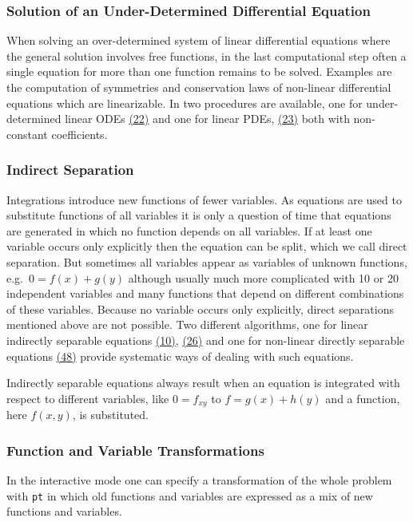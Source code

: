 \subsubsection{Solution of an Under-Determined Differential Equation}

When solving an over-determined system of linear differential
equations where the general solution involves free functions, in the
last computational step often a single equation for more than one
function remains to be solved.  Examples are the computation of
symmetries and conservation laws of non-linear differential equations
which are linearizable.  In  two procedures are
available, one for under-determined linear ODEs
\hyperlink{crack-m_22}{(22)} and one for linear PDEs,
\hyperlink{crack-m_23}{(23)} both with non-constant coefficients.

\subsubsection{Indirect Separation}

Integrations introduce new functions of fewer variables.  As equations
are used to substitute functions of all variables it is only a
question of time that equations are generated in which no function
depends on all variables.  If at least one variable occurs only
explicitly then the equation can be split, which we call direct
separation.  But sometimes all variables appear as variables of
unknown functions, e.g.\ $0=f(x)+g(y)$ although usually much more
complicated with 10 or 20 independent variables and many functions
that depend on different combinations of these variables.  Because no
variable occurs only explicitly, direct separations mentioned above
are not possible.  Two different algorithms, one for linear indirectly
separable equations \hyperlink{crack-m_10}{(10)},
\hyperlink{crack-m_26}{(26)} and one for non-linear directly separable
equations \hyperlink{crack-m_48}{(48)} provide systematic ways of
dealing with such equations.

Indirectly separable equations always result when an equation is
integrated with respect to different variables, like $0=f_{xy}$ to
$f=g(x)+h(y)$ and a function, here $f(x,y)$, is substituted.

\subsubsection{Function and Variable Transformations}

In the interactive mode one can specify a transformation of the whole
problem with \texttt{pt} in which old functions and variables are
expressed as a mix of new functions and variables.


